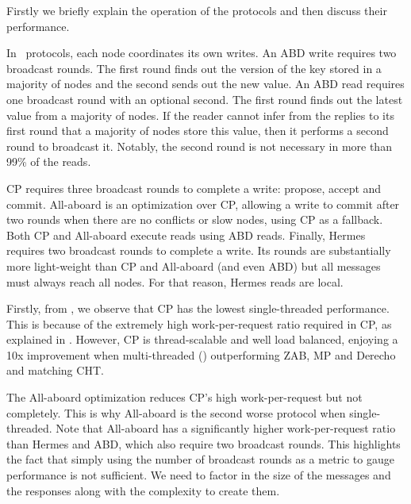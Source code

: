 Firstly we briefly explain the operation of the protocols and then discuss their performance.

 
In \DPKO~protocols, each node coordinates its own writes.
An ABD write requires two broadcast rounds. The first round finds out the version of the key stored in a majority of nodes and the second sends out the new value.
An ABD read requires one broadcast round with an optional second. The first round finds out the latest value from a majority of nodes. If the reader cannot infer from the replies to its first round that a majority of nodes store this value, then it performs a second round to broadcast it. Notably, the second round is not necessary in more than 99\% of the reads.

CP requires three broadcast rounds to complete a write: propose, accept and commit.
All-aboard is an optimization over CP, allowing a write to commit after two rounds when there are no conflicts or slow nodes, using CP as a fallback.
Both CP and All-aboard execute reads using ABD reads.
Finally, Hermes requires two broadcast rounds to complete a write. Its rounds are substantially more light-weight than CP and All-aboard (and even ABD) but all messages must always reach all nodes. For that reason, Hermes reads are local.





Firstly, from , we observe that CP has the lowest single-threaded performance. This is because of the extremely high work-per-request ratio required in CP, as explained in . However,  CP is thread-scalable and well load balanced, enjoying a 10x improvement when multi-threaded () outperforming ZAB, MP and Derecho and matching CHT.

The All-aboard optimization reduces CP's high work-per-request but not completely.
This is why All-aboard is the second worse protocol when single-threaded.
Note that All-aboard has a significantly higher work-per-request ratio than Hermes and ABD, which also require two broadcast rounds. 
This highlights the fact that simply using the number of broadcast rounds as a metric to gauge performance is not sufficient. We need to factor in the size of the messages and the responses along with the complexity to create them.



